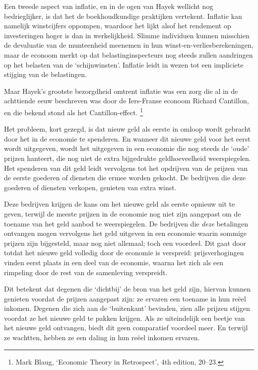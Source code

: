 \documentclass[smalldemyvopaper,11pt,twoside,onecolumn,openright,extrafontsizes,hidelinks]{memoir}
\begin{document}
Een tweede aspect van inflatie, en in de ogen van Hayek wellicht nog
bedrieglijker, is dat het de boekhoudkundige praktijken vertekent.
Inflatie kan namelijk winstcijfers oppompen, waardoor het lijkt alsof
het rendement op investeringen hoger is dan in werkelijkheid. Slimme
individuen kunnen misschien de devaluatie van de munteenheid meenemen in
hun winst-en-verliesberekeningen, maar de econoom merkt op dat
belastinginspecteurs nog steeds zullen aandringen op het belasten van de
`schijnwinsten'. Inflatie leidt in wezen tot een impliciete stijging van
de belastingen.

Maar Hayek's grootste bezorgdheid omtrent inflatie was een zorg die al
in de achttiende eeuw beschreven was door de Iers-Franse econoom Richard
Cantillon, en die bekend stond als het Cantillon-effect. \footnote{\hspace{0pt}Mark
  Blaug, `Economic Theory in Retrospect', 4th edition, 20--23.}

Het probleem, kort gezegd, is dat nieuw geld als eerste in omloop wordt
gebracht door het in de economie te spenderen. En wanneer dit nieuwe
geld voor het eerst wordt uitgegeven, wordt het uitgegeven in een
economie die nog steeds de `oude' prijzen hanteert, die nog niet de
extra bijgedrukte geldhoeveelheid weerspiegelen. Het spenderen van dit
geld leidt vervolgens tot het opdrijven van de prijzen van de eerste
goederen of diensten die ermee worden gekocht. De bedrijven die deze
goederen of diensten verkopen, genieten van extra winst.

Deze bedrijven krijgen de kans om het nieuwe geld als eerste opnieuw uit
te geven, terwijl de meeste prijzen in de economie nog niet zijn
aangepast om de toename van het geld aanbod te weerspiegelen. De
bedrijven die \emph{deze} betalingen ontvangen mogen vervolgens het geld
uitgeven in een economie waarin sommige prijzen zijn bijgesteld, maar
nog niet allemaal; toch een voordeel. Dit gaat door totdat het nieuwe
geld volledig door de economie is verspreid: prijsverhogingen vinden
eerst plaats in een deel van de economie, waarna het zich als een
rimpeling door de rest van de samenleving verspreidt.

Dit betekent dat degenen die `dichtbij' de bron van het geld zijn,
hiervan kunnen genieten voordat de prijzen aangepast zijn: ze ervaren
een toename in hun reëel inkomen. Degenen die zich aan de `buitenkant'
bevinden, zien alle prijzen stijgen voordat ze het nieuwe geld te pakken
krijgen. Als ze uiteindelijk een beetje van het nieuwe geld ontvangen,
biedt dit geen comparatief voordeel meer. En terwijl ze wachtten, hebben
ze een daling in hun reëel inkomen ervaren.
\end{document}
